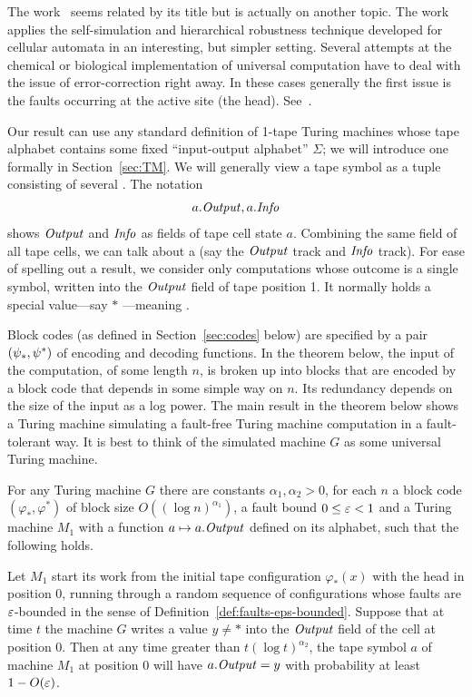 \documentclass[11pt]{memoir}
\theoremstyle{definition} %
\renewcommand{\le}{\leq}
\newcommand{\fld}[1]{\ensuremath{\textit{#1\/}}}
\def\G{G} %
\newcommand{\Info}{\fld{Info}}
\newcommand{\Output}{\fld{Output}}
\begin{document}
The work~\cite{AsarinCollins2005} seems related by its title 
but is actually on another topic.
The work~\cite{DurandRomashShenTiling12} applies the self-simulation and
hierarchical robustness technique developed for cellular automata in an interesting, but
simpler setting.
Several attempts at the chemical or
biological implementation of universal computation have to deal with
the issue of error-correction right away.
In these cases generally the first issue is the faults occurring at the active site (the head).
See~\cite{BennettThermodynComp1982,QianSoloveichikWinfree2011}.

Our result can use any standard definition of 1-tape Turing machines whose tape alphabet
contains some fixed ``input-output alphabet'' \( \Sigma \); we will
introduce one formally in Section~\ref{sec:TM}.
We will generally view a tape symbol as a tuple consisting of several .
The notation
\begin{align*}
   a.\Output, a.\Info
 \end{align*}
 shows \( \Output \) and \( \Info \) as fields of tape cell state \( a \).
Combining the same field of all tape cells, we can talk about a 
(say the \( \Output \) track and \( \Info \) track).
For ease of spelling out a result, we consider only computations whose outcome
is a single symbol, written into the \( \Output \) field of tape position 1.
It normally holds a special value---say \( * \) ---meaning .

 Block codes (as defined in Section~\ref{sec:codes} below) are specified by a pair \( (\psi_{*},\psi^{*}) \)
of encoding and decoding functions.
In the theorem below, the input of the computation, of some length \( n \), is broken up into blocks
that are encoded by a block code that depends in some simple way on \( n \).
Its redundancy depends on the size of the input as a log power.
The main result in the theorem below shows a Turing machine simulating a fault-free
Turing machine computation in a fault-tolerant way.
It is best to think of the simulated machine \( G \) as some universal Turing machine.

\begin{theorem}\label{thm:main}
  For any Turing machine \( \G \) there are constants \( \alpha_{1},\alpha_{2}>0 \),
for each \( n \) a block code \( (\varphi_{*}, \varphi^{*}) \) of block size \( O((\log n)^{\alpha_{1}}) \),
a fault bound  \( 0\le\eps <1 \) and a Turing machine \( M_{1} \) with a 
function \( a\mapsto a.\Output \) defined on its alphabet,
such that the following holds.

Let \( M_{1} \) start its work from the initial tape configuration \( \varphi_{*}(x) \) with the head
in position 0,
running through a random sequence of configurations whose faults are \( \varepsilon \)-bounded in the sense
of Definition~\ref{def:faults-eps-bounded}.
Suppose that at time \( t \) the machine \( \G \) writes a value \( y\ne * \) 
into the \( \Output \) field of the cell at position 0.
Then at any time greater than \(    t(\log t)^{\alpha_{2}} \),
 the tape symbol \( a \) of machine \( M_{1} \) at position 0
 will have \( a.\Output= y \) with probability at least \( 1 - O(\varepsilon) \).
\end{theorem}
\end{document}
